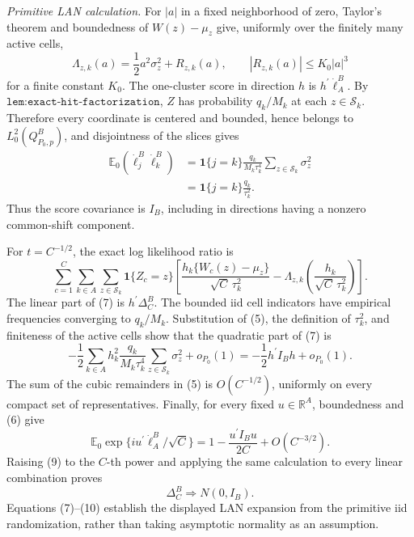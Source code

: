 \emph{Primitive LAN calculation.}
For \(|a|\) in a fixed neighborhood of zero, Taylor's theorem and boundedness of \(W(z)-\mu_z\) give, uniformly over the finitely many active cells,
\[
 \Lambda_{z,k}(a)=\frac12a^2\sigma_z^2+R_{z,k}(a),
 \qquad |R_{z,k}(a)|\leq K_0|a|^3                                  \tag{5}
\]
for a finite constant \(K_0\).  The one-cluster score in direction \(h\) is \(h^{\prime}\dot\ell_A^B\).  By \(\texttt{lem:exact-hit-factorization}\), \(Z\) has probability \(q_k/M_k\) at each \(z\in\mathcal S_k\).  Therefore every coordinate is centered and bounded, hence belongs to \(L^2_0(Q^B_{P_0,p})\), and disjointness of the slices gives
\[
 \begin{aligned}
 \mathbb E_0(\dot\ell_j^B\dot\ell_k^B)
 &=\mathbf 1\{j=k\}\frac{q_k}{M_k\tau_k^4}
   \sum_{z\in\mathcal S_k}\sigma_z^2  \\
 &=\mathbf 1\{j=k\}\frac{q_k}{\tau_k^2}.
 \end{aligned}                                                       \tag{6}
\]
Thus the score covariance is \(I_B\), including in directions having a nonzero common-shift component.

For \(t=C^{-1/2}\), the exact log likelihood ratio is
\[
 \sum_{c=1}^C\sum_{k\in A}\sum_{z\in\mathcal S_k}
 \mathbf 1\{Z_c=z\}
 \left[\frac{h_k\{W_c(z)-\mu_z\}}{\sqrt C\,\tau_k^2}
 -\Lambda_{z,k}\!\left(\frac{h_k}{\sqrt C\,\tau_k^2}\right)\right]. \tag{7}
\]
The linear part of (7) is \(h^{\prime}\Delta_C^B\).  The bounded iid cell indicators have empirical frequencies converging to \(q_k/M_k\).  Substitution of (5), the definition of \(\tau_k^2\), and finiteness of the active cells show that the quadratic part of (7) is
\[
 -\frac12\sum_{k\in A}h_k^2\frac{q_k}{M_k\tau_k^4}
       \sum_{z\in\mathcal S_k}\sigma_z^2+o_{P_0}(1)
 =-\frac12h^{\prime}I_Bh+o_{P_0}(1).                               \tag{8}
\]
The sum of the cubic remainders in (5) is \(O(C^{-1/2})\), uniformly on every compact set of representatives.  Finally, for every fixed \(u\in\mathbb R^A\), boundedness and (6) give
\[
 \mathbb E_0\exp\{iu^{\prime}\dot\ell_A^B/\sqrt C\}
 =1-\frac{u^{\prime}I_Bu}{2C}+O(C^{-3/2}).                         \tag{9}
\]
Raising (9) to the \(C\)-th power and applying the same calculation to every linear combination proves
\[
 \Delta_C^B\Rightarrow N(0,I_B).                                  \tag{10}
\]
Equations (7)--(10) establish the displayed LAN expansion from the primitive iid randomization, rather than taking asymptotic normality as an assumption.

